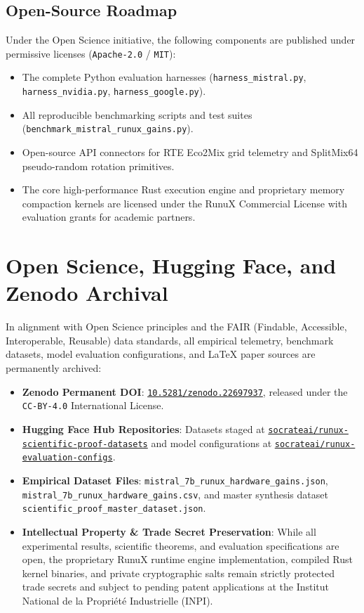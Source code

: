 \documentclass[10pt,twocolumn]{article}
\begin{document}
\subsection{Open-Source Roadmap}
Under the Open Science initiative, the following components are published under permissive licenses (\texttt{Apache-2.0} / \texttt{MIT}):
\begin{itemize}
    \item The complete Python evaluation harnesses (\texttt{harness\_mistral.py}, \texttt{harness\_nvidia.py}, \texttt{harness\_google.py}).
    \item All reproducible benchmarking scripts and test suites (\texttt{benchmark\_mistral\_runux\_gains.py}).
    \item Open-source API connectors for RTE Eco2Mix grid telemetry and SplitMix64 pseudo-random rotation primitives.
    \item The core high-performance Rust execution engine and proprietary memory compaction kernels are licensed under the RunuX Commercial License with evaluation grants for academic partners.
\end{itemize}

\section{Open Science, Hugging Face, and Zenodo Archival}

In alignment with Open Science principles and the FAIR (Findable, Accessible, Interoperable, Reusable) data standards, all empirical telemetry, benchmark datasets, model evaluation configurations, and LaTeX paper sources are permanently archived:
\begin{itemize}
    \item \textbf{Zenodo Permanent DOI}: \href{https://doi.org/10.5281/zenodo.22697937}{\texttt{10.5281/zenodo.22697937}}, released under the \texttt{CC-BY-4.0} International License.
    \item \textbf{Hugging Face Hub Repositories}: Datasets staged at \href{https://huggingface.co/datasets/socrateai/runux-scientific-proof-datasets}{\texttt{socrateai/runux-scientific-proof-datasets}} and model configurations at \href{https://huggingface.co/socrateai/runux-evaluation-configs}{\texttt{socrateai/runux-evaluation-configs}}.
    \item \textbf{Empirical Dataset Files}: \texttt{mistral\_7b\_runux\_hardware\_gains.json}, \texttt{mistral\_7b\_runux\_hardware\_gains.csv}, and master synthesis dataset \texttt{scientific\_proof\_master\_dataset.json}.
    \item \textbf{Intellectual Property \& Trade Secret Preservation}: While all experimental results, scientific theorems, and evaluation specifications are open, the proprietary RunuX runtime engine implementation, compiled Rust kernel binaries, and private cryptographic salts remain strictly protected trade secrets and subject to pending patent applications at the Institut National de la Propri\'{e}t\'{e} Industrielle (INPI).
\end{itemize}
\end{document}
